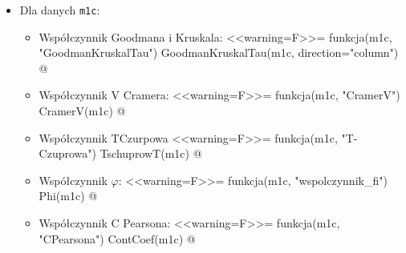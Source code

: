 \documentclass[12pt]{mwart}
\begin{document}
\begin{itemize}
\begin{itemize}[label=$\bullet$]
		\item Współczynnik V Cramera:
		<<warning=F>>=
		funkcja(m1b, "CramerV")
		CramerV(m1b)
		@
		
		\item Współczynnik T{\dywiz}Czurpowa
		<<warning=F>>=
		funkcja(m1b, "T-Czuprowa")
		TschuprowT(m1b)
		@
		
		\item Współczynnik $\varphi$:
		<<warning=F>>=
		funkcja(m1b, "wspolczynnik_fi")
		Phi(m1b)
		@
		
		\item Współczynnik C Pearsona:
		<<warning=F>>=
		funkcja(m1b, "CPearsona")
		ContCoef(m1b)
		@
	\end{itemize}

	\item Dla danych \verb|m1c|:
	\begin{itemize}[label=$\bullet$]
		\item Współczynnik Goodmana i Kruskala:
		<<warning=F>>=
		funkcja(m1c, "GoodmanKruskalTau")
		GoodmanKruskalTau(m1c, direction="column")
		@
		
		\item Współczynnik V Cramera:
		<<warning=F>>=
		funkcja(m1c, "CramerV")
		CramerV(m1c)
		@
		
		\item Współczynnik T{\dywiz}Czurpowa
		<<warning=F>>=
		funkcja(m1c, "T-Czuprowa")
		TschuprowT(m1c)
		@
		
		\item Współczynnik $\varphi$:
		<<warning=F>>=
		funkcja(m1c, "wspolczynnik_fi")
		Phi(m1c)
		@
		
		\item Współczynnik C Pearsona:
		<<warning=F>>=
		funkcja(m1c, "CPearsona")
		ContCoef(m1c)
		@
	\end{itemize}
\end{itemize}
\end{document}

